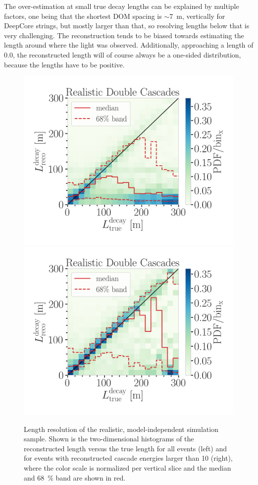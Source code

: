 The over-estimation at small true decay lengths can be explained by multiple factors, one being that the shortest DOM spacing is $\sim$\SI{7}{\meter}, vertically for DeepCore strings, but mostly larger than that, so resolving lengths below that is very challenging. The reconstruction tends to be biased towards estimating the length around where the light was observed. Additionally, approaching a length of 0.0, the reconstructed length will of course always be a one-sided distribution, because the lengths have to be positive.

\begin{figure}[h]
	\centering
    \includegraphics[width=0.49\linewidth]{figures/model_independent_simulation/results/realistic/2d_hists/194603_reco_decay_length_vs_true_decay_length_goodfit_step_contours.png}
    \includegraphics[width=0.49\linewidth]{figures/model_independent_simulation/results/realistic/2d_hists/194603_reco_decay_length_vs_true_decay_length_goodfit_above_10_GeV_step_contours}
    \caption[Realistic double-cascade length resolution]{Length resolution of the realistic, model-independent simulation sample. Shown is the two-dimensional histograms of the reconstructed length versus the true length for all events (left) and for events with reconstructed cascade energies larger than \SI{10}{\gev} (right), where the color scale is normalized per vertical slice and the median and \SI{68}{\percent} band are shown in red.}
\end{figure}

